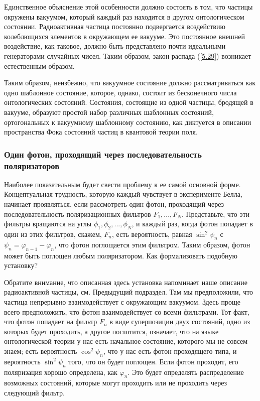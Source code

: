 \documentclass[main.tex]{subfiles}
\begin{document}
Единственное объяснение этой особенности должно состоять в том, что частицы окружены вакуумом, который каждый раз находится в другом онтологическом состоянии. Радиоактивная частица постоянно подвергается воздействию колеблющихся элементов в окружающем ее вакууме. Это постоянное внешней воздействие, как таковое, должно быть представлено почти идеальными генераторами случайных чисел. Таким образом, закон распада (\ref{5.29}) возникает естественным образом.

Таким образом, неизбежно, что вакуумное состояние должно рассматриваться как одно шаблонное состояние, которое, однако, состоит из бесконечного числа онтологических состояний. Состояния, состоящие из одной частицы, бродящей в вакууме, образуют простой набор различных шаблонных состояний, ортогональных к вакуумному шаблонному состоянию, как диктуется в описании пространства Фока состояний частиц в квантовой теории поля.


\subsubsection{Один фотон, проходящий через последовательность поляризаторов}\label{ch5.7.8}

Наиболее показательным будет свести проблему к ее самой основной форме. Концептуальная трудность, которую каждый чувствует в эксперименте Белла, начинает проявляться, если рассмотреть один фотон, проходящий через последовательность поляризационных фильтров $F_1, ..., F_N$. Представьте, что эти фильтры вращаются на углы $\phi_1, \phi_2, ..., \phi_N$, и каждый раз, когда фотон попадает в один из этих фильтров, скажем, $F_n$, есть вероятность, равная $\sin^2 \psi_n$ с $\psi_n = \varphi_{n-1} - \varphi_n$, что фотон поглощается этим фильтром. Таким образом, фотон может быть поглощен любым поляризатором. Как формализовать подобную установку?

Обратите внимание, что описанная здесь установка напоминает наше описание радиоактивной частицы, см. Предыдущий подраздел. Там мы предположили, что частица непрерывно взаимодействует с окружающим вакуумом. Здесь проще всего предположить, что фотон взаимодействует со всеми фильтрами. Тот факт, что фотон попадает на фильтр $F_n$ в виде суперпозиции двух состояний, одно из которых будет проходить, а другое поглотится, означает, что на языке онтологической теории у нас есть начальное состояние, которого мы не совсем знаем; есть вероятность $\cos^2 \psi_n$, что у нас есть фотон проходящего типа, и вероятность $\sin^2 \psi_n$ того, что он будет поглощен. Если фотон проходит, его поляризация хорошо определена, как $\varphi_n$. Это будет определять распределение возможных состояний, которые могут проходить или не проходить через следующий фильтр.
\end{document}
